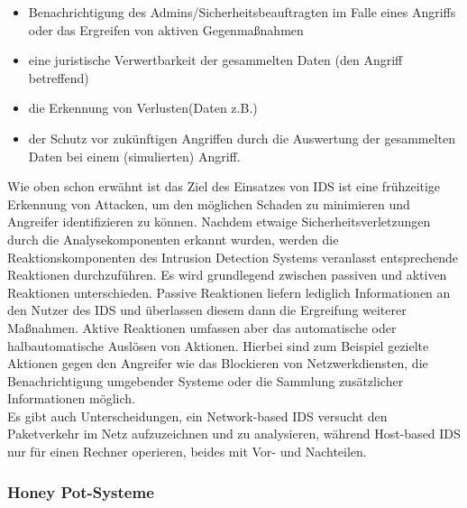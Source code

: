 \documentclass[letterpaper, 12pt]{article}
\let\tempsubsubsection\subsubsection
\renewcommand\subsubsection[1]{\vspace{0cm}\tempsubsubsection{#1}\vspace{0cm}}
\begin{document}
\begin{itemize}
	\item Benachrichtigung des Admins/Sicherheitsbeauftragten im Falle eines Angriffs oder
das Ergreifen von aktiven Gegenmaßnahmen
	\item eine juristische Verwertbarkeit der gesammelten Daten (den Angriff betreffend)
	\item die Erkennung von Verlusten(Daten z.B.)
	\item der Schutz vor zukünftigen Angriffen durch die Auswertung der gesammelten Daten
bei einem (simulierten) Angriff.
\end{itemize}

Wie oben schon erwähnt ist das Ziel des Einsatzes von IDS
ist eine frühzeitige Erkennung von Attacken, um den möglichen Schaden zu minimieren
und Angreifer identifizieren zu können. Nachdem etwaige Sicherheitsverletzungen durch die Analysekomponenten erkannt wurden,
werden die Reaktionskomponenten des Intrusion Detection Systems veranlasst entsprechende
Reaktionen durchzuführen. Es wird grundlegend zwischen passiven und aktiven
Reaktionen unterschieden. Passive Reaktionen liefern lediglich Informationen an
den Nutzer des IDS und überlassen diesem dann die Ergreifung weiterer Maßnahmen.
Aktive Reaktionen umfassen aber das automatische oder halbautomatische Auslösen
von Aktionen. Hierbei sind zum Beispiel gezielte Aktionen gegen den Angreifer wie das
Blockieren von Netzwerkdiensten, die Benachrichtigung umgebender Systeme oder die
Sammlung zusätzlicher Informationen möglich. \\
Es gibt auch Unterscheidungen, ein Network-based IDS versucht den Paketverkehr im Netz aufzuzeichnen und zu analysieren, während Host-based IDS nur für einen Rechner operieren, beides mit Vor- und Nachteilen. \cite{ausarbeitungsec}

\subsubsection{Honey Pot-Systeme}
\end{document}
